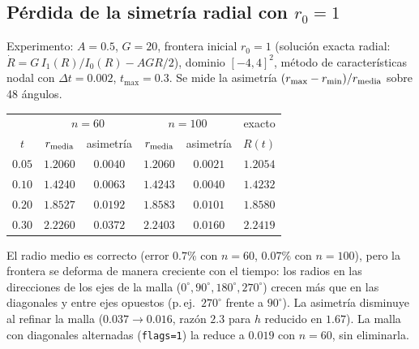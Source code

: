 \subsection{Pérdida de la simetría radial con $r_0=1$}

Experimento: $A=0.5$, $G=20$, frontera inicial $r_0=1$ (solución exacta radial: $\dot R=G\,I_1(R)/I_0(R)-AGR/2$), dominio $[-4,4]^2$, método de características nodal con $\Delta t=0.002$, $t_{\max}=0.3$. Se mide la asimetría $(r_{\max}-r_{\min})/r_{\rm media}$ sobre 48 ángulos.

\begin{center}
\begin{tabular}{c|cc|cc|c}
\toprule
 & \multicolumn{2}{c|}{$n=60$} & \multicolumn{2}{c|}{$n=100$} & exacto\\
$t$ & $r_{\rm media}$ & asimetría & $r_{\rm media}$ & asimetría & $R(t)$\\
\midrule
$0.05$ & $1.2060$ & $0.0040$ & $1.2060$ & $0.0021$ & $1.2054$\\
$0.10$ & $1.4240$ & $0.0063$ & $1.4243$ & $0.0040$ & $1.4232$\\
$0.20$ & $1.8527$ & $0.0192$ & $1.8583$ & $0.0101$ & $1.8580$\\
$0.30$ & $2.2260$ & $0.0372$ & $2.2403$ & $0.0160$ & $2.2419$\\
\bottomrule
\end{tabular}
\end{center}

El radio medio es correcto (error $0.7\%$ con $n=60$, $0.07\%$ con $n=100$), pero la frontera se deforma de manera creciente con el tiempo: los radios en las direcciones de los ejes de la malla ($0^\circ,90^\circ,180^\circ,270^\circ$) crecen más que en las diagonales y entre ejes opuestos (p.\,ej.\ $270^\circ$ frente a $90^\circ$). La asimetría disminuye al refinar la malla ($0.037\to0.016$, razón $2.3$ para $h$ reducido en $1.67$). La malla con diagonales alternadas (\texttt{flags=1}) la reduce a $0.019$ con $n=60$, sin eliminarla.

